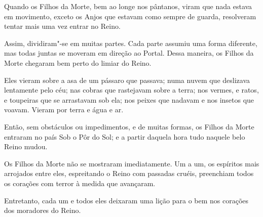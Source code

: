 Quando os Filhos da Morte, bem ao longe nos pântanos, viram que nada
estava em movimento, exceto os Anjos que estavam como
sempre de guarda, resolveram tentar mais uma vez entrar no
Reino.

Assim, dividiram"-se em muitas partes. Cada parte assumiu uma forma
diferente, mas todas juntas se moveram em direção ao Portal. Dessa maneira, os
Filhos da Morte chegaram bem perto do limiar do Reino.

Eles vieram sobre a asa de um pássaro que passava; numa nuvem que
deslizava lentamente pelo céu; nas cobras que rastejavam sobre a terra;
nos vermes, e ratos, e toupeiras que se arrastavam sob ela; nos peixes
que nadavam e nos insetos que voavam. Vieram por terra e água e ar.

Então, sem obstáculos ou impedimentos, e de muitas formas, os Filhos da
Morte entraram no país Sob o Pôr do Sol; e a partir daquela hora tudo
naquele belo Reino mudou.

Os Filhos da Morte não se mostraram imediatamente. Um a um, os
espíritos mais arrojados entre eles, espreitando o Reino com passadas cruéis, preenchiam todos os corações com terror à medida que
avançaram.

Entretanto, cada um e todos eles deixaram uma lição para o bem nos
corações dos moradores do Reino.